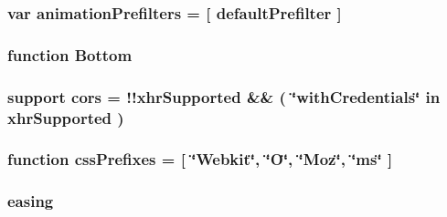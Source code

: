 \hypertarget{jquery-1_89_81_8js_adb3f17c5359fbc12b7043b6969553d78}{
\subsubsection[{animation\+Prefilters}]{\setlength{\rightskip}{0pt plus 5cm}var animation\+Prefilters = \mbox{[} {\bf default\+Prefilter} \mbox{]}}}\label{jquery-1_89_81_8js_adb3f17c5359fbc12b7043b6969553d78}
\hypertarget{jquery-1_89_81_8js_aff76c1cba4a00c678dfce0e0c5a5538a}{
\subsubsection[{Bottom}]{\setlength{\rightskip}{0pt plus 5cm}function Bottom}}\label{jquery-1_89_81_8js_aff76c1cba4a00c678dfce0e0c5a5538a}
\hypertarget{jquery-1_89_81_8js_a4b8fe3fdfa8cb03b32c86e4a36575dfc}{
\subsubsection[{cors}]{ {\bf support} cors = !!{\bf xhr\+Supported} \&\& ( \char`\"{}with\+Credentials\char`\"{} in {\bf xhr\+Supported} )}}\label{jquery-1_89_81_8js_a4b8fe3fdfa8cb03b32c86e4a36575dfc}
\hypertarget{jquery-1_89_81_8js_a2ed3892172b336458b8074254f4471da}{
\subsubsection[{css\+Prefixes}]{\setlength{\rightskip}{0pt plus 5cm}function css\+Prefixes = \mbox{[} \char`\"{}Webkit\char`\"{}, \char`\"{}O\char`\"{}, \char`\"{}Moz\char`\"{}, \char`\"{}ms\char`\"{} \mbox{]}}}\label{jquery-1_89_81_8js_a2ed3892172b336458b8074254f4471da}
\hypertarget{jquery-1_89_81_8js_a9758a312629fa6de1744280dd6e6253b}{
\subsubsection[{easing}]{ easing}}\label{jquery-1_89_81_8js_a9758a312629fa6de1744280dd6e6253b}
